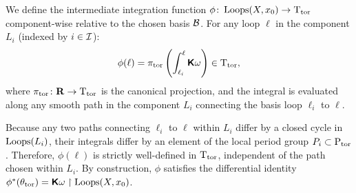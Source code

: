 \documentclass[11pt,reqno,letterpaper,twoside]{amsart}
\begin{document}
  \begin{article}
    \label{art:The Intermediate Integration Function}
    
    We define the intermediate integration function $\phi \colon \operatorname{Loops}(X, x_0) \to \mathrm{T}_{\mathrm{tor}}$ component-wise relative to the chosen basis $\mathcal{B}$.
    For any loop $\ell$ in the component $L_i$ (indexed by $i \in \mathcal{I}$):
    \[
      \phi(\ell) = \pi_{\mathrm{tor}} \left( \int_{\ell_i}^\ell \boldsymbol{\mathsf{K}}\omega \right) \in \mathrm{T}_{\mathrm{tor}},
      \]
    where $\pi_{\mathrm{tor}} \colon {\mathbf{R}} \to \mathrm{T}_{\mathrm{tor}}$ is the canonical projection,
    and the integral is evaluated along any smooth path in the component $L_i$ connecting the basis loop $\ell_i$ to $\ell$.
    
    Because any two paths connecting $\ell_i$ to $\ell$ within $L_i$ differ by a closed cycle in $\operatorname{Loops}(L_i)$,
    their integrals differ by an element of the local period group $P_i \subset \operatorname{P}_{\mathrm{tor}}$.
    Therefore,
    $\phi(\ell)$ is strictly well-defined in $\mathrm{T}_{\mathrm{tor}}$,
    independent of the path chosen within $L_i$.
    By construction,
    $\phi$ satisfies the differential identity $\phi^*(\theta_{\mathrm{tor}}) = \boldsymbol{\mathsf{K}}\omega \restriction \operatorname{Loops}(X, x_0)$.
  \end{article}
  
\end{document}
